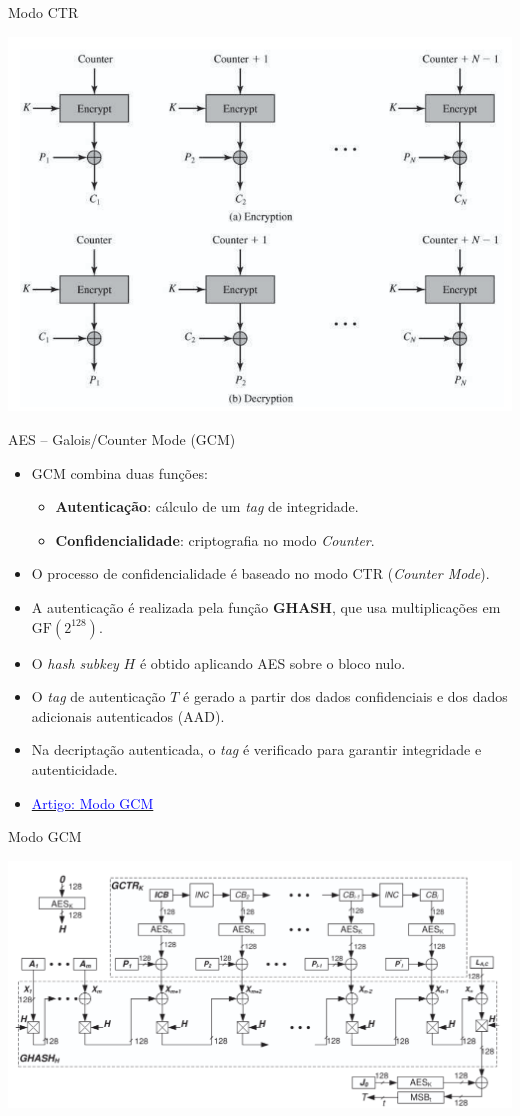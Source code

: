 \begin{frame}{Modo CTR}


\centering
    \includegraphics[width=0.6\linewidth]{Figuras/aes-modo-ctr.png}
    
\end{frame}

\begin{frame}{AES -- Galois/Counter Mode (GCM)}
    \begin{itemize}
        \item GCM combina duas funções: 
        \begin{itemize}
            \item \textbf{Autenticação}: cálculo de um \textit{tag} de integridade.
            \item \textbf{Confidencialidade}: criptografia no modo \textit{Counter}.
        \end{itemize}
        \item O processo de confidencialidade é baseado no modo CTR (\textit{Counter Mode}).
        \item A autenticação é realizada pela função \textbf{GHASH}, que usa multiplicações em $\text{GF}(2^{128})$.
        \item O \textit{hash subkey} $H$ é obtido aplicando AES sobre o bloco nulo.
        \item O \textit{tag} de autenticação $T$ é gerado a partir dos dados confidenciais e dos dados adicionais autenticados (AAD).
        \item Na decriptação autenticada, o \textit{tag} é verificado para garantir integridade e autenticidade.
        \item \href{https://ieeexplore.ieee.org/abstract/document/5953585?casa_token=4XfQGwEHfSEAAAAA:RZKOvTWEOaYpC0nIW8kEB8omke-XhdiG9iwkC4OEsp1yMXiZ6lIv6ckx9g_CffSJiCGgF9QCEg}{\textcolor{blue}{Artigo: Modo GCM}}
    \end{itemize}
\end{frame}

\begin{frame}{Modo GCM}


\centering
    \includegraphics[width=0.8\linewidth]{Figuras/aes-modo-gcm.png}
    
\end{frame}